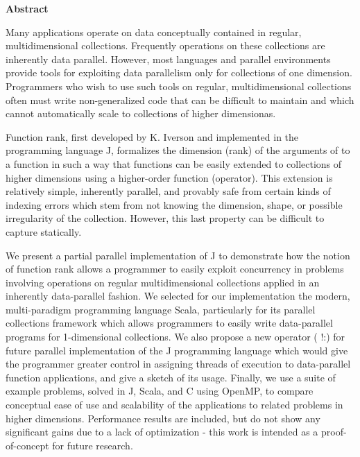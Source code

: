 \begin{center}

\bigskip

\begin{Large}
\textbf{\theTitle}
\end{Large}

\bigskip

\begin{large}
\theAuthor
\end{large}

\bigskip
\bigskip

\textbf{Abstract}

\end{center}

\noindent
Many applications operate on data conceptually contained in regular, multidimensional collections.
Frequently operations on these collections are inherently data parallel.
However, most languages and parallel environments provide tools for exploiting data parallelism only for collections of one dimension.
Programmers who wish to use such tools on regular, multidimensional collections often must write non-generalized code that can be difficult to maintain and which cannot automatically scale to collections of higher dimensionas.

Function rank, first developed by K. Iverson and implemented in the programming language J, formalizes the dimension (rank) of the arguments of to a function in such a way that functions can be easily extended to collections of higher dimensions using a higher-order function (operator).
This extension is relatively simple, inherently parallel, and provably safe from certain kinds of indexing errors which stem from not knowing the dimension, shape, or possible irregularity of the collection.
However, this last property can be difficult to capture statically.

We present a partial parallel implementation of J to demonstrate how the notion of function rank allows a programmer to easily exploit concurrency in problems involving operations on regular multidimensional collections applied in an inherently data-parallel fashion.
We selected for our implementation the modern, multi-paradigm programming language Scala, particularly for its parallel collections framework which allows programmers to easily write data-parallel programs for 1-dimensional collections.
We also propose a new operator ( !:\normalfont) for future parallel implementation of the J programming language which would give the programmer greater control in assigning threads of execution to data-parallel function applications, and give a sketch of its usage.
Finally, we use a suite of example problems, solved in J, Scala, and C using OpenMP, to compare conceptual ease of use and scalability of the applications to related problems in higher dimensions.
Performance results are included, but do not show any significant gains due to a lack of optimization - this work is intended as a proof-of-concept for future research.
